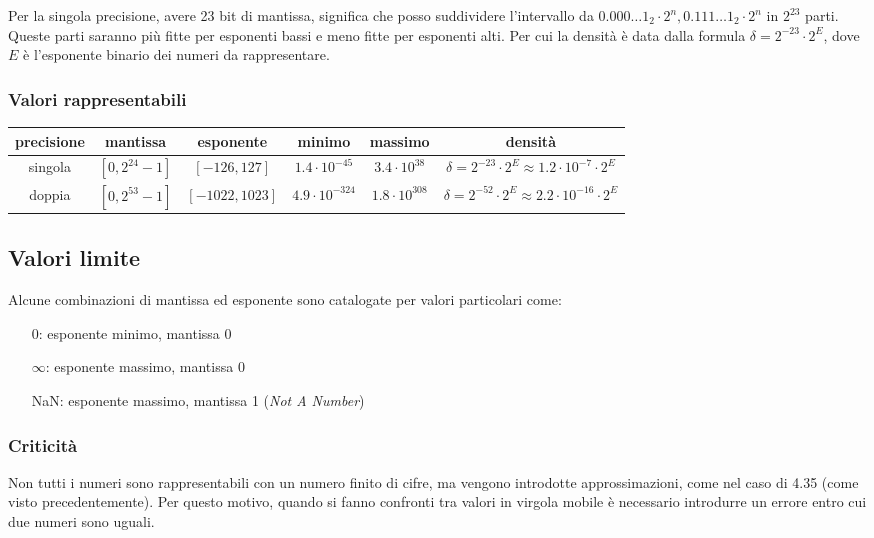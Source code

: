 \documentclass[a4paper]{article}
\begin{document}
Per la singola precisione, avere 23 bit di mantissa, significa che posso suddividere l'intervallo da \(0.000\dots1_2 \cdot 2^n,0.111\dots1_2 \cdot 2^n\)
in \(2^{23}\) parti. Queste parti saranno più fitte per esponenti bassi e meno fitte per esponenti alti. Per cui la densità
è data dalla formula \(\delta = 2^{-23} \cdot 2^E\), dove \(E\) è l'esponente binario dei numeri da rappresentare.


\subsubsection*{Valori rappresentabili}
\begin{center}
	\begin{tabular}{c c c c c c}
		\textbf{precisione} & \textbf{mantissa} & \textbf{esponente} & \textbf{minimo} & \textbf{massimo} & \textbf{densità} \\
		\toprule
		singola & \(\left[0, 2^{24} - 1\right]\) & \(\left[-126, 127\right]\) & \(1.4 \cdot 10^{-45}\) & \(3.4 \cdot 10^{38}\) & \(\delta = 2^{-23} \cdot 2^E \approx 1.2 \cdot 10^{-7} \cdot 2^E\) \\
		\midrule
		doppia & \(\left[0, 2^{53} - 1\right]\) & \(\left[-1022, 1023\right]\) & \(4.9 \cdot 10^{-324}\) & \(1.8 \cdot 10^{308}\) & \(\delta = 2^{-52} \cdot 2^E \approx 2.2 \cdot 10^{-16} \cdot 2^E\) \\
		\bottomrule
	\end{tabular}
\end{center}

\subsection*{Valori limite}
Alcune combinazioni di mantissa ed esponente sono catalogate per valori particolari come:
\begin{itemize} [topsep=3pt, itemsep=0pt]
	\item[\(0\): ] esponente minimo, mantissa 0
	\item[\(\infty\): ] esponente massimo, mantissa 0
	\item[NaN: ] esponente massimo, mantissa 1 (\textit{Not A Number}) 
\end{itemize}

\subsubsection*{Criticità}
Non tutti i numeri sono rappresentabili con un numero finito di cifre, ma vengono introdotte approssimazioni, come nel
caso di 4.35 (come visto precedentemente). Per questo motivo, quando si fanno confronti tra valori in virgola mobile è
necessario introdurre un errore entro cui due numeri sono uguali.
\end{document}
